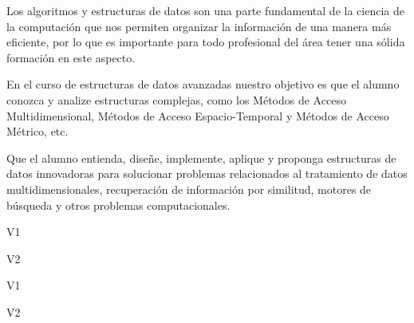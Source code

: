 \begin{syllabus}


\begin{justification}
Los algoritmos y estructuras de datos son una parte fundamental de la ciencia de la computación que nos 
permiten organizar la información de una manera más eficiente, por lo que es importante para todo 
profesional del área tener una sólida formación en este aspecto.

En el curso de estructuras de datos avanzadas nuestro objetivo es que el alumno conozca y analize 
estructuras complejas, como los Métodos de Acceso Multidimensional, 
Métodos de Acceso Espacio-Temporal y Métodos de Acceso Métrico, etc.
\end{justification}

\begin{goals}
\item Que el alumno entienda, diseñe, implemente, aplique y
proponga estructuras de datos innovadoras para solucionar
problemas relacionados al tratamiento de datos multidimensionales,
recuperación de información por similitud, motores de búsqueda y
otros problemas computacionales.
\end{goals}

\begin{outcomes}{V1}
   \item {}
   \item {}
   \item {}
\end{outcomes}

\begin{outcomes}{V2}
   \item {}
   \item {}
   \item {}
\end{outcomes}

\begin{competences}{V1}
    \item {} 
    \item {}
    \item {}
\end{competences}

\begin{competences}{V2}
    \item {} 
    \item {}
    \item {}
\end{competences}


\end{syllabus}
